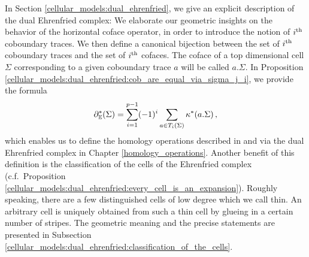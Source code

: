 In Section \ref{cellular_models:dual_ehrenfried}, we give an explicit description of the dual Ehrenfried complex:
We elaborate our geometric insights on the behavior of the horizontal coface operator, in order to introduce the notion of $i^{\text{th}}$ coboundary traces.
We then define a canonical bijection
between the set of $i^{\text{th}}$ coboundary traces and the set of $i^{\text{th}}$ cofaces.
The coface of a top dimensional cell $\Sigma$ corresponding to a given coboundary trace $a$ will be called $a.\Sigma$.
In Proposition \ref{cellular_models:dual_ehrenfried:cob_are_equal_via_sigma_j_i}, we provide the formula
\[
    \partial_\mathbb E^\ast(\Sigma) = \sum_{i=1}^{p-1} (-1)^i \sum_{a \in T_i(\Sigma)} \kappa^\ast(a.\Sigma)\,,
\]
which enables us to define the homology operations described in \cite{Boedigheimer19902} and \cite{Boedigheimer201314} via the dual Ehrenfried complex in Chapter \ref{homology_operations}.
Another benefit of this definition is the classification of the cells of the Ehrenfried complex (c.f.\ Proposition \ref{cellular_models:dual_ehrenfried:every_cell_is_an_expansion}).
Roughly speaking, there are a few distinguished cells of low degree which we call thin.
An arbitrary cell is uniquely obtained from such a thin cell by glueing in a certain number of stripes.
The geometric meaning and the precise statements are presented in Subsection \ref{cellular_models:dual_ehrenfried:classification_of_the_cells}.

